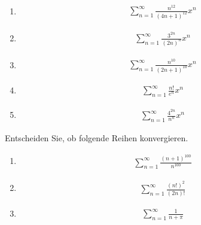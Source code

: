 \documentclass{article}
\begin{document}
\begin{multicols}{3}
\begin{enumerate}
    \item \begin{align*}
        \sum_{n = 1}^{\infty}\frac{n^{12}}{(4n + 1)^{12}}x^n
    \end{align*}

    \item \begin{align*}
        \sum_{n = 1}^{\infty}\frac{3^{2n}}{(2n)^{n}}x^n
    \end{align*}

    \item \begin{align*}
        \sum_{n = 1}^{\infty}\frac{n^{10}}{(2n + 1)^10}x^n
    \end{align*}

    \item \begin{align*}
        \sum_{n = 1}^{\infty}\frac{n!}{e^n}x^n
    \end{align*}

    \item \begin{align*}
        \sum_{n = 1}^{\infty}\frac{4^{2n}}{n^n}x^n
    \end{align*}
\end{enumerate}
\end{multicols}

Entscheiden Sie, ob folgende Reihen konvergieren.

\begin{multicols}{3}
\begin{enumerate}
    \item \begin{align*}
        \sum_{n = 1}^{\infty} \frac{(n + 1)^{100}}{n^{100}}
    \end{align*}

    \item \begin{align*}
        \sum_{n = 1}^{\infty} \frac{(n!)^2}{(2n)!}
    \end{align*}

    \item \begin{align*}
        \sum_{n = 1}^{\infty} \frac{1}{n + \pi}
    \end{align*}
\end{enumerate}
\end{multicols}
\end{document}
